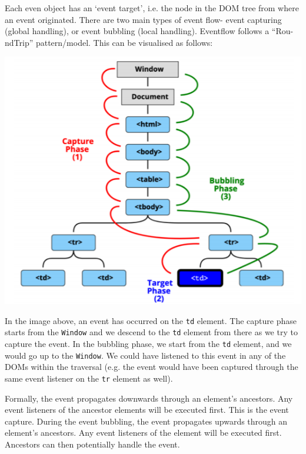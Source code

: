 \documentclass[a4paper, openany]{memoir}
\begin{document}
\noindent Each even object has an `event target', i.e. the node in the DOM tree from where an event originated. There are two main types of event flow- event capturing (global handling), or event bubbling (local handling). Eventflow follows a ``Rou-ndTrip'' pattern/model. This can be visualised as follows:
\begin{center}
    \includegraphics[scale=0.8]{src/L12I3.PNG}
\end{center}
In the image above, an event has occurred on the \texttt{td} element. The capture phase starts from the \texttt{Window} and we descend to the \texttt{td} element from there as we try to capture the event. In the bubbling phase, we start from the \texttt{td} element, and we would go up to the \texttt{Window}. We could have listened to this event in any of the DOMs within the traversal (e.g. the event would have been captured through the same event listener on the \texttt{tr} element as well).

\noindent Formally, the event propagates downwards through an element's ancestors. Any event listeners of the ancestor elements will be executed first. This is the event capture. During the event bubbling, the event propagates upwards through an element's ancestors. Any event listeners of the element will be executed first. Ancestors can then potentially handle the event.
\end{document}
